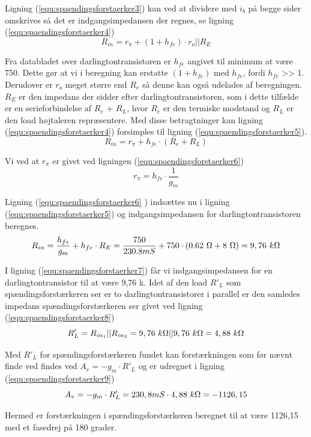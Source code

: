Ligning (\ref{equ:spaendingsforstaerker3}) kan ved at dividere med $i_b$ på begge sider omskrives så det er indgangsimpedansen der regnes, se ligning (\ref{equ:spaendingsforstaerker4})
\begin{equation}
\label{equ:spaendingsforstaerker4}
R_{in} = r_{\pi} + (1+h_{fe}) \cdot r_o||R_E 
\end{equation}

Fra databladet over darlingtontransistoren er $h_{fe}$ angivet til minimum at være 750. Dette gør at vi i beregning kan erstatte $(1+h_{fe})$ med $h_{fe}$, fordi $h_{fe}$ >> 1. Derudover er $r_o$ meget større end $R_e$ så denne kan også udelades af beregningen. $R_E$ er den impedans der sidder efter darlingtontransistoren, som i dette tilfælde er en serieforbindelse af $R_e$ + $R_L$, hvor $R_e$ er den termiske modstand og $R_L$ er den load højtaleren repræsentere. Med disse betragtninger kan ligning (\ref{equ:spaendingsforstaerker4}) forsimples til ligning (\ref{equ:spaendingsforstaerker5}).
\begin{equation}
\label{equ:spaendingsforstaerker5}
R_{in} = r_{\pi} + h_{fe} \cdot (R_e + R_L)
\end{equation}

Vi ved at $r_{\pi}$ er givet ved ligningen (\ref{equ:spaendingsforstaerker6})
\begin{equation}
\label{equ:spaendingsforstaerker6}
r_{\pi} = h_{fe} \cdot \frac{1}{g_m}
\end{equation}

Ligning (\ref{equ:spaendingsforstaerker6} ) indsættes nu i ligning (\ref{equ:spaendingsforstaerker5}) og indgangsimpedansen for darlingtontransistoren beregnes.
\begin{equation}
\label{equ:spaendingsforstaerker7}
R_{in} = \frac{h_{fe}}{g_m} + h_{fe} \cdot R_E = \frac{750}{230.8 mS} + 750 \cdot (0.62~\ohm + 8~\ohm) = 9,76~k\ohm  
\end{equation}

I ligning (\ref{equ:spaendingsforstaerker7}) får vi indgangsimpedansen for en darlingtontransistor til at være 9,76 k\ohm. Idet af den load $R'_L$ som spændingsforstærkeren ser er to darlingtontransistorer i parallel er den samledes impedans spændingsforstærkeren ser givet ved ligning (\ref{equ:spaendingsforstaerker8})
\begin{equation}
\label{equ:spaendingsforstaerker8}
R'_L = R_{in_1}||R_{in_2} = 9,76~k\ohm||9,76~k\ohm = 4,88~k\ohm
\end{equation}  

Med $R'_L$ for spændingsforstærkeren fundet kan forstærkningen som før nævnt finde ved findes ved $A_v = -g_m \cdot R'_L$ og er udregnet i ligning (\ref{equ:spaendingsforstaerker9})
\begin{equation}
\label{equ:spaendingsforstaerker9}
A_v = -g_m \cdot R'_L = 230,8 mS \cdot 4,88~k\ohm = -1126,15
\end{equation}

Hermed er forstærkningen i spændingsforstærkeren beregnet til at være 1126,15 med et fasedrej på 180 grader.